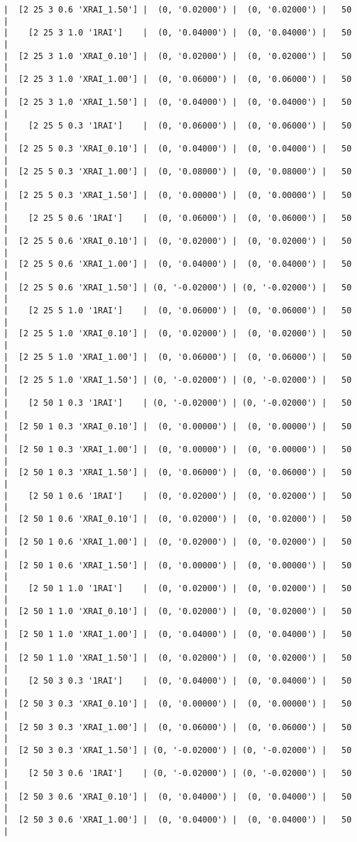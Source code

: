 \documentclass{article}
\begin{document}
\begin{verbatim}
|  [2 25 3 0.6 'XRAI_1.50'] |  (0, '0.02000') |  (0, '0.02000') |   50  |
|    [2 25 3 1.0 '1RAI']    |  (0, '0.04000') |  (0, '0.04000') |   50  |
|  [2 25 3 1.0 'XRAI_0.10'] |  (0, '0.02000') |  (0, '0.02000') |   50  |
|  [2 25 3 1.0 'XRAI_1.00'] |  (0, '0.06000') |  (0, '0.06000') |   50  |
|  [2 25 3 1.0 'XRAI_1.50'] |  (0, '0.04000') |  (0, '0.04000') |   50  |
|    [2 25 5 0.3 '1RAI']    |  (0, '0.06000') |  (0, '0.06000') |   50  |
|  [2 25 5 0.3 'XRAI_0.10'] |  (0, '0.04000') |  (0, '0.04000') |   50  |
|  [2 25 5 0.3 'XRAI_1.00'] |  (0, '0.08000') |  (0, '0.08000') |   50  |
|  [2 25 5 0.3 'XRAI_1.50'] |  (0, '0.00000') |  (0, '0.00000') |   50  |
|    [2 25 5 0.6 '1RAI']    |  (0, '0.06000') |  (0, '0.06000') |   50  |
|  [2 25 5 0.6 'XRAI_0.10'] |  (0, '0.02000') |  (0, '0.02000') |   50  |
|  [2 25 5 0.6 'XRAI_1.00'] |  (0, '0.04000') |  (0, '0.04000') |   50  |
|  [2 25 5 0.6 'XRAI_1.50'] | (0, '-0.02000') | (0, '-0.02000') |   50  |
|    [2 25 5 1.0 '1RAI']    |  (0, '0.06000') |  (0, '0.06000') |   50  |
|  [2 25 5 1.0 'XRAI_0.10'] |  (0, '0.02000') |  (0, '0.02000') |   50  |
|  [2 25 5 1.0 'XRAI_1.00'] |  (0, '0.06000') |  (0, '0.06000') |   50  |
|  [2 25 5 1.0 'XRAI_1.50'] | (0, '-0.02000') | (0, '-0.02000') |   50  |
|    [2 50 1 0.3 '1RAI']    | (0, '-0.02000') | (0, '-0.02000') |   50  |
|  [2 50 1 0.3 'XRAI_0.10'] |  (0, '0.00000') |  (0, '0.00000') |   50  |
|  [2 50 1 0.3 'XRAI_1.00'] |  (0, '0.00000') |  (0, '0.00000') |   50  |
|  [2 50 1 0.3 'XRAI_1.50'] |  (0, '0.06000') |  (0, '0.06000') |   50  |
|    [2 50 1 0.6 '1RAI']    |  (0, '0.02000') |  (0, '0.02000') |   50  |
|  [2 50 1 0.6 'XRAI_0.10'] |  (0, '0.02000') |  (0, '0.02000') |   50  |
|  [2 50 1 0.6 'XRAI_1.00'] |  (0, '0.02000') |  (0, '0.02000') |   50  |
|  [2 50 1 0.6 'XRAI_1.50'] |  (0, '0.00000') |  (0, '0.00000') |   50  |
|    [2 50 1 1.0 '1RAI']    |  (0, '0.02000') |  (0, '0.02000') |   50  |
|  [2 50 1 1.0 'XRAI_0.10'] |  (0, '0.02000') |  (0, '0.02000') |   50  |
|  [2 50 1 1.0 'XRAI_1.00'] |  (0, '0.04000') |  (0, '0.04000') |   50  |
|  [2 50 1 1.0 'XRAI_1.50'] |  (0, '0.02000') |  (0, '0.02000') |   50  |
|    [2 50 3 0.3 '1RAI']    |  (0, '0.04000') |  (0, '0.04000') |   50  |
|  [2 50 3 0.3 'XRAI_0.10'] |  (0, '0.00000') |  (0, '0.00000') |   50  |
|  [2 50 3 0.3 'XRAI_1.00'] |  (0, '0.06000') |  (0, '0.06000') |   50  |
|  [2 50 3 0.3 'XRAI_1.50'] | (0, '-0.02000') | (0, '-0.02000') |   50  |
|    [2 50 3 0.6 '1RAI']    | (0, '-0.02000') | (0, '-0.02000') |   50  |
|  [2 50 3 0.6 'XRAI_0.10'] |  (0, '0.04000') |  (0, '0.04000') |   50  |
|  [2 50 3 0.6 'XRAI_1.00'] |  (0, '0.04000') |  (0, '0.04000') |   50  |

\end{verbatim}
\end{document}
